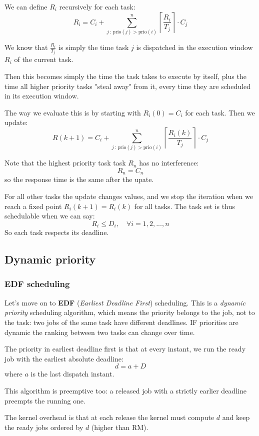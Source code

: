 \documentclass[a4paper,11pt]{article}
\begin{document}
We can define $R_i$ recursively for each task:
$$
	R_i = C_i + \sum_{j \, : \, \text{prio}(j) > \text{prio}(i)}^n \left\lceil \frac{R_i}{T_j} \right\rceil \cdot C_j
$$

We know that $\frac{R_i}{T_j}$ is simply the time task $j$ is dispatched in the execution window $R_i$ of the current task.

Then this becomes simply the time the task takes to execute by itself, plus the time all higher priority tasks "steal away" from it, every time they are scheduled in its execution window.

The way we evaluate this is by starting with $R_i(0) = C_i$ for each task.
Then we update:
$$
	R(k + 1) = C_i + \sum_{j \, : \, \text{prio}(j) > \text{prio}(i)}^n \left\lceil \frac{R_i(k)}{T_j} \right\rceil \cdot C_j
$$

Note that the highest priority task task $R_n$ has no interference:
$$
	R_n = C_n
$$
so the response time is the same after the upate.

For all other tasks the update changes values, and we stop the iteration when we reach a fixed point $R_i(k + 1) = R_i(k)$ for all tasks. The task set is thus schedulable when we can say:
$$
	R_i \leq D_i, \quad \forall i = 1, 2, ..., n
$$
So each task respects its deadline.

\subsection{Dynamic priority}

\subsubsection{EDF scheduling}

Let's move on to \textbf{EDF} (\textit{Earliest Deadline First}) scheduling. This is a \textit{dynamic priority} scheduling algorithm, which means the priority belongs to the job, not to the task: two jobs of the same task have different deadlines. IF priorities are dynamic the ranking between two tasks can change over time.

The priority in earliest deadline first is that at every instant, we run the ready job with the earliest absolute deadline:
$$
	d = a + D
$$
where $a$ is the last dispatch instant.

This algorithm is preemptive too: a released job with a strictly earlier deadline preempts the running one.

The kernel overhead is that at each release the kernel must compute $d$ and keep the ready jobs ordered by $d$ (higher than RM).
\end{document}
